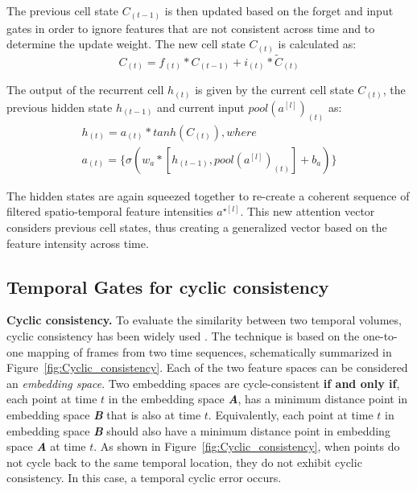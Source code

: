 \documentclass[final,5p,times,twocolumn]{elsarticle}
\begin{document}
The previous cell state $C_{(t-1)}$ is then updated based on the forget and input gates in order to ignore features that are not consistent across time and to determine the update weight. The new cell state $C_{(t)}$ is calculated as:
\vspace{-0.5mm}
\begin{equation}
\label{eq:update}
    C_{(t)} = f_{(t)} * C_{(t-1)} + i_{(t)} * \widetilde{C}_{(t)}
\end{equation}

The output of the recurrent cell $h_{(t)}$ is given by the current cell state $C_{(t)}$, the previous hidden state $h_{(t-1)}$ and current input $pool(a^{[l]})_{(t)}$ as:
\vspace{-0.5mm}
\begin{equation}
\label{eq:lstmout}
\begin{split}
h_{(t)} = a_{(t)} * tanh(C_{(t)}), where \qquad \qquad \\
a_{(t)} =\{ \sigma(w_{a} * [h_{(t-1)},pool(a^{[l]})_{(t)}] + b_{a}) \}
\end{split}
\end{equation}

The hidden states are again squeezed together to re-create a coherent sequence of filtered spatio-temporal feature intensities $a^{\star[l]}$. This new attention vector considers previous cell states, thus creating a generalized vector based on the feature intensity across time.

\subsection{Temporal Gates for cyclic consistency}
\label{sec:TG}

\textbf{Cyclic consistency.} To evaluate the similarity between two temporal volumes, cyclic consistency has been widely used \citep{dwibedi2019temporal,wang2019learning}. The technique is based on the one-to-one mapping of frames from two time sequences, schematically summarized in Figure~\ref{fig:Cyclic_consistency}. Each of the two feature spaces can be considered an \textit{embedding space}. Two embedding spaces are cycle-consistent \textbf{if and only if}, each point at time  $t$ in the embedding space \textbf{\textit{A}}, has a minimum distance point in embedding space \textbf{\textit{B}} that is also at time $t$. Equivalently, each point at time $t$ in embedding space \textbf{\textit{B}} should also have a minimum distance point in embedding space \textbf{\textit{A}} at time $t$. As shown in Figure~\ref{fig:Cyclic_consistency}, when points do not cycle back to the same temporal location, they do not exhibit cyclic consistency. In this case, a temporal cyclic error occurs.
\end{document}
